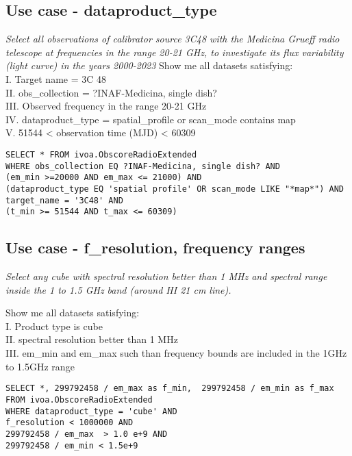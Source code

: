 \subsection{Use case - dataproduct\_type}
\textit{Select all observations of calibrator source 3C48 with the Medicina Grueff radio telescope at frequencies in the range 20-21 GHz, to investigate its flux variability (light curve) in the years 2000-2023}
Show me all datasets satisfying: \\
I. Target name = 3C 48 \\
II. obs\_collection = ?INAF-Medicina, single dish?\\
III. Observed frequency in the range 20-21 GHz \\
IV. dataproduct\_type = spatial\_profile or scan\_mode contains map\\
V. 51544 < observation time (MJD) < 60309 \\
\begin{verbatim}
SELECT * FROM ivoa.ObscoreRadioExtended
WHERE obs_collection EQ ?INAF-Medicina, single dish? AND
(em_min >=20000 AND em_max <= 21000) AND
(dataproduct_type EQ 'spatial profile' OR scan_mode LIKE "*map*") AND
target_name = '3C48' AND
(t_min >= 51544 AND t_max <= 60309)
\end{verbatim}

\subsection{Use case - f\_resolution, frequency ranges}
\label{sec:FreqRanges}

\textit{Select any cube with spectral resolution better than 1 MHz and spectral range inside the 1 to 1.5 GHz band (around HI 21 cm line).}

Show me all datasets satisfying:\\
I. Product type is cube \\
II. spectral resolution better than 1 MHz \\
III. em\_min and em\_max such than frequency bounds are included in the 1GHz to 1.5GHz range \\
\begin{verbatim}
SELECT *, 299792458 / em_max as f_min,  299792458 / em_min as f_max 
FROM ivoa.ObscoreRadioExtended
WHERE dataproduct_type = 'cube' AND
f_resolution < 1000000 AND
299792458 / em_max  > 1.0 e+9 AND
299792458 / em_min < 1.5e+9
\end{verbatim}

